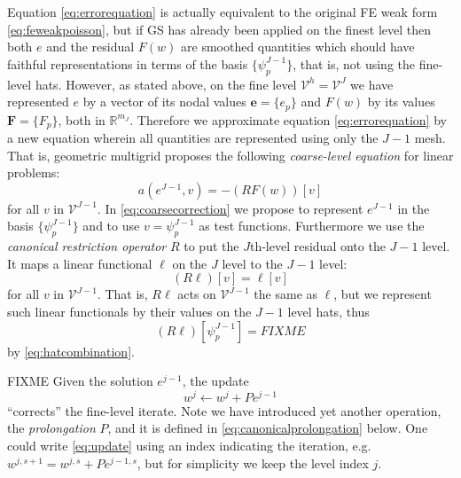 \documentclass[letterpaper,final,12pt,reqno]{amsart}
\theoremstyle{claim}
\newcommand{\RR}{\mathbb{R}}
\newcommand{\be}{\mathbf{e}}
\newcommand{\bF}{\mathbf{F}}
\numberwithin{equation}{section}
\numberwithin{figure}{section}
\numberwithin{table}{section}
\begin{document}
Equation \eqref{eq:errorequation} is actually equivalent to the original FE weak form \eqref{eq:feweakpoisson}, but if GS has already been applied on the finest level then both $e$ and the residual $F(w)$ are smoothed quantities which should have faithful representations in terms of the basis $\{\psi_p^{J-1}\}$, that is, not using the fine-level hats.  However, as stated above, on the fine level $\mathcal{V}^h=\mathcal{V}^J$ we have represented $e$ by a vector of its nodal values $\be = \{e_p\}$ and $F(w)$ by its values $\bF=\{F_p\}$, both in $\RR^{m_J}$.  Therefore we approximate equation \eqref{eq:errorequation} by a new equation wherein all quantities are represented using only the $J-1$ mesh.  That is, geometric multigrid proposes the following \emph{coarse-level equation} for linear problems:
\begin{equation}
  a(e^{J-1},v) = - (RF(w))[v]  \label{eq:coarsecorrection}
\end{equation}
for all $v$ in $\mathcal{V}^{J-1}$.  In \eqref{eq:coarsecorrection} we propose to represent $e^{J-1}$ in the basis $\{\psi_p^{J-1}\}$ and to use $v=\psi_p^{J-1}$ as test functions.  Furthermore we use the \emph{canonical restriction operator} $R$ to put the $J$th-level residual onto the $J-1$ level.  It maps a linear functional $\ell$ on the $J$ level to the $J-1$ level:
\begin{equation}
  (R \ell)[v] = \ell[v] \label{eq:canonicalrestriction}
\end{equation}
for all $v$ in $\mathcal{V}^{J-1}$.  That is, $R \ell$ acts on $\mathcal{V}^{J-1}$ the same as $\ell$, but we represent such linear functionals by their values on the $J-1$ level hats, thus
\begin{equation}
  (R \ell)[\psi_p^{J-1}] = FIXME
\end{equation}
by \eqref{eq:hatcombination}.

FIXME  Given the solution $e^{j-1}$, the update
\begin{equation}
  w^j \gets w^j + P e^{j-1}  \label{eq:update}
\end{equation}
``corrects'' the fine-level iterate.  Note we have introduced yet another operation, the \emph{prolongation} $P$, and it is defined in \eqref{eq:canonicalprolongation} below.  One could write \eqref{eq:update} using an index indicating the iteration, e.g.~$w^{j,s+1} = w^{j,s} + Pe^{j-1,s}$, but for simplicity we keep the level index $j$.
\end{document}
